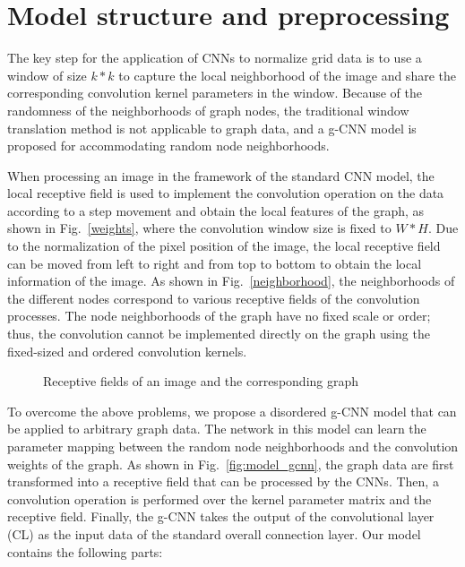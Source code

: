 \documentclass[11pt]{article}
\begin{document}
\section{Model structure and preprocessing}

The key step for the application of CNNs to normalize grid data is to use a window of size $k*k$ to capture the local neighborhood of the image and share the corresponding convolution kernel parameters in the window. Because of the randomness of the neighborhoods of graph nodes, the traditional window translation method is not applicable to graph data, and a g-CNN model is proposed for accommodating random node neighborhoods.

When processing an image in the framework of the standard CNN model, the local receptive field is used to implement the convolution operation on the data according to a step movement and obtain the local features of the graph, as shown in Fig.~\ref{weights}, where the convolution window size is fixed to $W*H$. Due to the normalization of the pixel position of the image, the local receptive field can be moved from left to right and from top to bottom to obtain the local information of the image. As shown in Fig.~\ref{neighborhood}, the neighborhoods of the different nodes correspond to various receptive fields of the convolution processes. The node neighborhoods of the graph have no fixed scale or order; thus, the convolution cannot be implemented directly on the graph using the fixed-sized and ordered convolution kernels.


\begin{figure}[!htbp]
\centering
{}
\caption{Receptive fields of an image and the corresponding graph}\label{fig:imagetograph}
\end{figure}




To overcome the above problems, we propose a disordered g-CNN model that can be applied to arbitrary graph data. The network in this model can learn the parameter mapping between the random node neighborhoods and the convolution weights of the graph. As shown in Fig.~\ref{fig:model_gcnn}, the graph data are first transformed into a receptive field that can be processed by the CNNs. Then, a convolution operation is performed over the kernel parameter matrix and the receptive field. Finally, the g-CNN takes the output of the convolutional layer (CL) as the input data of the standard overall connection layer. Our model contains the following parts:
\end{document}
